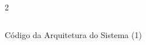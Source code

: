 \begin{figure}[H]
    \centering   
    \begin{tcolorbox}  
        \begin{multicols}{2} 
        \fontsize{9pt}{9pt}\selectfont\inputminted[obeytabs=true,tabsize=4,xleftmargin=20pt,linenos,breaklines,lastline=62]{VHDL}{VHDL/files/TLAB3.vhd}    
        \end{multicols}
    \end{tcolorbox}
    \caption{Código da Arquitetura do Sistema (1)}
\end{figure}